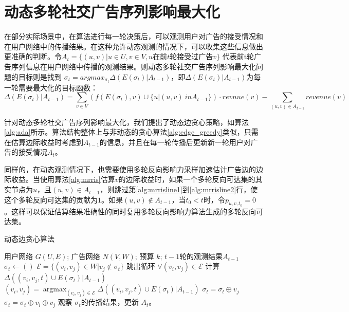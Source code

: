 \section{动态多轮社交广告序列影响最大化}
\label{sec:ada}

在部分实际场景中，在算法进行每一轮决策后，可以观测用户对广告的接受情况和在用户网络中的传播结果。在这种允许动态观测的情况下，可以收集这些信息做出更准确的判断。令$ A_t = \{(u,v) |  u \in U, v \in V ,u \text{在前}t\text{轮接受过广告}v\} $ 代表前t轮广告序列信息在用户网络中传播的观测结果。则动态多轮社交广告序列影响最大化问题的目标则是找到 $\sigma_t = arg max_{\sigma_t} \Delta(E(\sigma_t) | A_{t-1})$，即$\Delta(E(\sigma_t) | A_{t-1})$为每一轮需要最大化的目标函数：
\begin{equation}
    \Delta(E(\sigma_t) | A_{t-1}) = \sum_{v \in V} ( f(E(\sigma_t), v) \cup \{u | (u,v) \ in A_{t-1}\}) \cdot revnue(v) - \sum_{(u,v) \in A_{t-1}} revenue(v) 
\end{equation}

针对动态多轮社交广告序列影响最大化，我们提出了动态边贪心策略，如算法\ref{alg:ada}所示。算法结构整体上与非动态的贪心算法\ref{alg:edge_greedy}类似，只需在估算边际收益时考虑到$A_{t-1}$的信息，并且在每一轮传播后更新新一轮用户对广告的接受情况$A_{t}$。

同样的，在动态观测情况下，也需要使用多轮反向影响力采样加速估计广告边的边际收益。当使用算法\ref{alg:mrris}估算$v$的边际收益时，如果一个多轮反向可达集的其实节点为$u$，且$(u,v) \in A_{t-1}$，则跳过第\ref{alg:mrrisline1}到\ref{alg:mrrisline2}行，使这个多轮反向可达集的贡献为$1$。如果$(u,v) \notin A_{t-1}$，当$t_0 < t$时，令$p_{u,v,t_0} = 0$。这样可以保证估算结果准确性的同时复用多轮反向影响力算法生成的多轮反向可达集。

\begin{algorithm}[H]
    \caption{动态边贪心算法\label{alg:ada}}
    \begin{algorithmic}[1]
        \REQUIRE 用户网络 $G(U,E)$; 广告网络 $N(V,W)$; 预算 $k$; $t-1$轮的观测结果$A_{t - 1}$
        \STATE \(\sigma_t \gets ( )\)
            \STATE \(\mathcal{E} = \{(v_i,v_j) \in W | v_j \notin \sigma_t \}\)
                \STATE 跳出循环
            \ENDIF
            \STATE \(\forall (v_i,v_j) \in \mathcal{E}\) 计算 $\Delta({(v_i,v_j,t)} \cup E(\sigma_t)|A_{t-1})$
            \STATE \((v_i,v_j) = \mathop{\arg\max}_{(v_i,v_j) \in \mathcal{E}}\Delta({(v_i,v_j,t)} \cup E(\sigma_t)|A_{t-1}) \)
                \STATE \(\sigma_t = \sigma_t \oplus v_j\)
            \ELSE
                \STATE \(\sigma_t = \sigma_t \oplus v_i \oplus v_j\) 
            \ENDIF
        \ENDWHILE
        \STATE 观察 $\sigma_t$的传播结果，更新 $A_t$。
    \end{algorithmic}
\end{algorithm}

